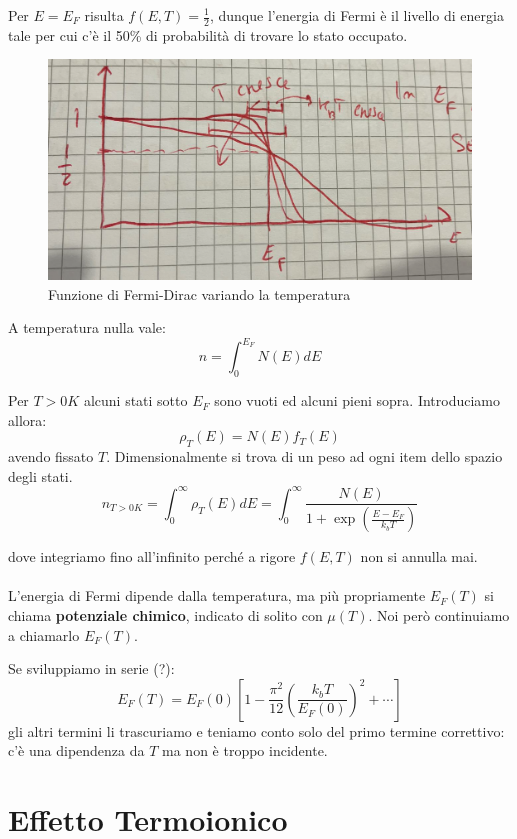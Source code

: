 \documentclass{book}
\begin{document}
            Per $E=E_{F}$ risulta $f(E,T) = \frac{1}{2}$, dunque l'energia di Fermi è il livello di energia tale per cui c'è il 50\% di probabilità di trovare lo stato occupato.
            \begin{figure}[h!]
                \centering
                \includegraphics[width=0.5\linewidth]{img/RobettaFermiLez12.png}
                \caption{Funzione di Fermi-Dirac variando la temperatura}
            \end{figure}

            A temperatura nulla vale:
            $$n = \int_{0} ^{E_{F}} N(E)dE$$

            Per $T>0K$ alcuni stati sotto $E_{F}$ sono vuoti ed alcuni pieni sopra. Introduciamo allora:
            $$\rho_{T}(E) = N(E)f_{T}(E)$$
            avendo fissato $T$. Dimensionalmente si trova di un peso ad ogni item dello spazio degli stati.
            $$n_{T>0K} = \int_{0} ^{\infty} \rho_{T} (E) dE = \int_{0} ^{\infty} \frac{N(E)}{1+\exp{(\frac{E-E_{F}}{k_{b}T})}}$$

            dove integriamo fino all'infinito perché a rigore $f(E,T)$ non si annulla mai.

        \paragraph{}
            L'energia di Fermi dipende dalla temperatura, ma più propriamente $E_{F}(T)$ si chiama \textbf{potenziale chimico}, indicato di solito con $\mu (T)$. Noi però continuiamo a chiamarlo $E_{F}(T)$.

            Se sviluppiamo in serie (?):
            $$E_{F}(T) = E_{F}(0)[1 - \frac{\pi ^{2}}{12}(\frac{k_{b}T}{E_{F}(0)})^{2}+ \cdots ]$$
            gli altri termini li trascuriamo e teniamo conto solo del primo termine correttivo: c'è una dipendenza da $T$ ma non è troppo incidente.


      \section{Effetto Termoionico}
\end{document}
